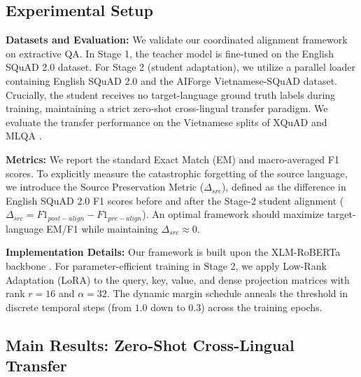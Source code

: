 \documentclass[11pt]{article}
\begin{document}
\subsection{Experimental Setup}
\label{sec:setup}
\textbf{Datasets and Evaluation:} We validate our coordinated alignment framework on extractive QA. In Stage 1, the teacher model is fine-tuned on the English SQuAD 2.0 dataset. For Stage 2 (student adaptation), we utilize a parallel loader containing English SQuAD 2.0 and the AIForge Vietnamese-SQuAD dataset. Crucially, the student receives no target-language ground truth labels during training, maintaining a strict zero-shot cross-lingual transfer paradigm. We evaluate the transfer performance on the Vietnamese splits of XQuAD \cite{artetxe-etal-2020-cross} and MLQA \cite{lewis-etal-2020-mlqa}. 

\textbf{Metrics:} We report the standard Exact Match (EM) and macro-averaged F1 scores. To explicitly measure the catastrophic forgetting of the source language, we introduce the Source Preservation Metric ($\Delta_{src}$), defined as the difference in English SQuAD 2.0 F1 scores before and after the Stage-2 student alignment ($\Delta_{src} = F1_{post-align} - F1_{pre-align}$). An optimal framework should maximize target-language EM/F1 while maintaining $\Delta_{src} \approx 0$.

\textbf{Implementation Details:} Our framework is built upon the XLM-RoBERTa backbone \cite{conneau-etal-2020-unsupervised}. For parameter-efficient training in Stage 2, we apply Low-Rank Adaptation (LoRA) \cite{hu2021loralowrankadaptationlarge} to the query, key, value, and dense projection matrices with rank $r=16$ and $\alpha=32$. The dynamic margin schedule anneals the threshold in discrete temporal steps (from $1.0$ down to $0.3$) across the training epochs. 

\subsection{Main Results: Zero-Shot Cross-Lingual Transfer}
\end{document}
